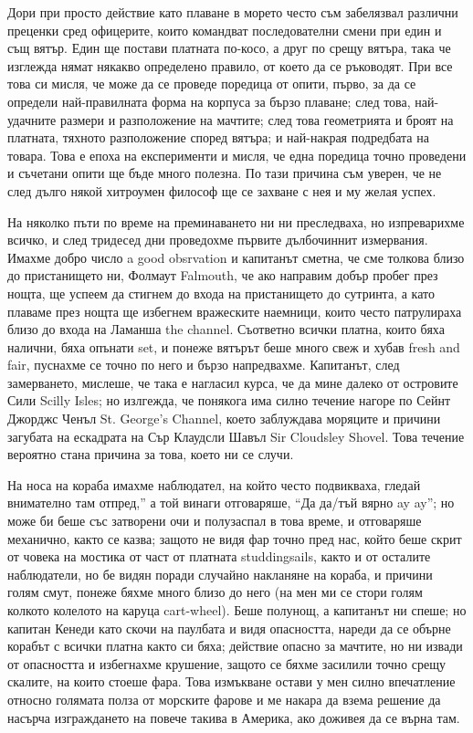 \documentclass[12pt]{book}
\begin{document}
Дори при просто действие като плаване в морето често съм забелязвал различни преценки сред офицерите, които командват последователни смени при един и същ вятър. Един ще постави платната по-косо, а друг по срещу вятъра, така че изглежда нямат някакво определено правило, от което да се ръководят. При все това си мисля, че може да се проведе поредица от опити, първо, за да се определи най-правилната форма на корпуса за бързо плаване; след това, най-удачните размери и разположение на мачтите; след това геометрията и броят на платната, тяхното разположение според вятъра; и най-накрая подредбата на товара. Това е епоха на експерименти и мисля, че една поредица точно проведени и съчетани опити ще бъде много полезна. По тази причина съм уверен, че не след дълго някой хитроумен философ ще се захване с нея и му желая успех.

На няколко пъти по време на преминаването ни ни преследваха, но изпреварихме всичко, и след тридесед дни проведохме първите дълбочиннит измервания. Имахме добро число a good obsrvation и капитанът сметна, че сме толкова близо до пристанището ни, Фолмаут Falmouth, че ако направим добър пробег през нощта, ще успеем да стигнем до входа на пристанището до сутринта, а като плаваме през нощта ще избегнем вражеските наемници, които често патрулираха близо до входа на Ламанша the channel. Съответно всички платна, които бяха налични, бяха опънати set, и понеже вятърът беше много свеж и хубав fresh and fair, пуснахме се точно по него и бързо напредвахме. Капитанът, след замерването, мислеше, че така е нагласил курса, че да мине далеко от островите Сили Scilly Isles; но излгежда, че понякога има силно течение нагоре по Сейнт Джорджс Ченъл St. George's Channel, което заблуждава моряците и причини загубата на ескадрата на Сър Клаудсли Шавъл Sir Cloudsley Shovel. Това течение вероятно стана причина за това, което ни се случи. 

На носа на кораба имахме наблюдател, на който често подвикваха, гледай внимателно там отпред,” а той винаги отговаряше, “Да да/тъй вярно ay ay”; но може би беше със затворени очи и полузаспал в това време, и отговаряше механично, както се казва; защото не видя фар точно пред нас, който беше скрит от човека на мостика от част от платната studdingsails, както и от осталите наблюдатели, но бе видян поради случайно накланяне на кораба, и причини голям смут, понеже бяхме много близо до него (на мен ми се стори голям колкото колелото на каруца cart-wheel). Беше полунощ, а капитанът ни спеше; но капитан Кенеди като скочи на паулбата и видя опасността, нареди да се обърне корабът с всички платна както си бяха; действие опасно за мачтите, но ни извади от опасността и избегнахме крушение, защото се бяхме засилили точно срещу скалите, на които стоеше фара. Това измъкване остави у мен силно впечатление относно голямата полза от морските фарове и ме накара да взема решение да насърча изграждането на повече такива в Америка, ако доживея да се върна там. 
\end{document}
